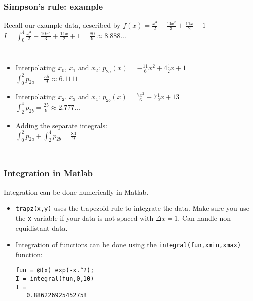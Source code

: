 \documentclass[11pt,table,final,fleqn,xcolor={usenames,dvipsnames,table}]{beamer}
\begin{document}
\begin{frame}
  \frametitle{Simpson's rule: example}
  \footnotesize\selectfont
  Recall our example data, described by $f(x)=\frac{x^3}{2}-\frac{10x^2}{3}+\frac{11x}{2}+1$ \\
  $ I = \int_0^4 \frac{x^3}{2}-\frac{10x^2}{3}+\frac{11x}{2}+1 = \frac{80}{9} \approx 8.888\ldots$
  \begin{columns}
    \begin{itemize}
      \item<2-> \color{tuered}Interpolating $x_0$, $x_1$ and $x_2$:  $ p_{2a}(x) = -\frac{11}{6}x^2+4\frac{1}{2}x+1 $ \\
      $\int_0^2 p_{2a} = \frac{55}{9} \approx 6.1111$
      \item<3-> \color{tuelblue} Interpolating $x_2$, $x_3$ and $x_4$: $ p_{2b}(x) = \frac{7x^2}{6}-7\frac{1}{2}x+13 $ \\
      $\int_2^4 p_{2b} = \frac{25}{9} \approx 2.777\ldots$
      \item<4-> Adding the separate integrals: \\
      $\int_0^2 p_{2a} + \int_2^4 p_{2b} = \frac{80}{9}$
    \end{itemize}
    \centering
  \end{columns}
\end{frame}

\begin{frame}[fragile]
  \frametitle{Integration in Matlab}
  Integration can be done numerically in Matlab.
  \begin{itemize}
    \item \lstinline$trapz(x,y)$ uses the trapezoid rule to integrate the data. Make sure you use the \lstinline$x$ variable if your data is not spaced with $\Delta x=1$. Can handle non-equidistant data.
    \item Integration of functions can be done using the \lstinline$integral(fun,xmin,xmax)$ function:
    \begin{lstlisting}
fun = @(x) exp(-x.^2);
I = integral(fun,0,10)
I =
   0.886226925452758
    \end{lstlisting}
  \end{itemize}
\end{frame}
\end{document}
